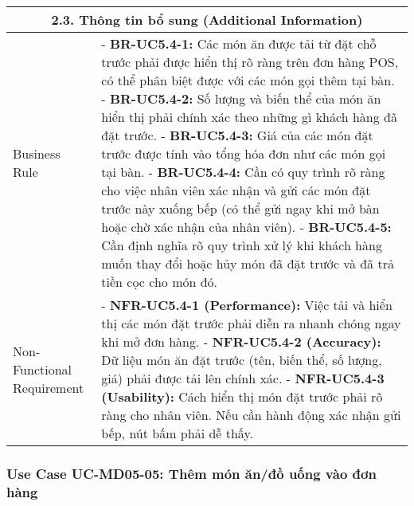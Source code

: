 \begin{longtable}{|m{4cm}|p{11cm}|}
\hline
\multicolumn{2}{|c|}{\textbf{2.3. Thông tin bổ sung (Additional Information)}} \\
\hline
Business Rule & - \textbf{BR-UC5.4-1:} Các món ăn được tải từ đặt chỗ trước phải được hiển thị rõ ràng trên đơn hàng POS, có thể phân biệt được với các món gọi thêm tại bàn. \newline - \textbf{BR-UC5.4-2:} Số lượng và biến thể của món ăn hiển thị phải chính xác theo những gì khách hàng đã đặt trước. \newline - \textbf{BR-UC5.4-3:} Giá của các món đặt trước được tính vào tổng hóa đơn như các món gọi tại bàn. \newline - \textbf{BR-UC5.4-4:} Cần có quy trình rõ ràng cho việc nhân viên xác nhận và gửi các món đặt trước này xuống bếp (có thể gửi ngay khi mở bàn hoặc chờ xác nhận của nhân viên). \newline - \textbf{BR-UC5.4-5:} Cần định nghĩa rõ quy trình xử lý khi khách hàng muốn thay đổi hoặc hủy món đã đặt trước và đã trả tiền cọc cho món đó. \\
\hline
Non-Functional Requirement & - \textbf{NFR-UC5.4-1 (Performance):} Việc tải và hiển thị các món đặt trước phải diễn ra nhanh chóng ngay khi mở đơn hàng. \newline - \textbf{NFR-UC5.4-2 (Accuracy):} Dữ liệu món ăn đặt trước (tên, biến thể, số lượng, giá) phải được tải lên chính xác. \newline - \textbf{NFR-UC5.4-3 (Usability):} Cách hiển thị món đặt trước phải rõ ràng cho nhân viên. Nếu cần hành động xác nhận gửi bếp, nút bấm phải dễ thấy. \\
\hline
\end{longtable}

\subsubsection{Use Case UC-MD05-05: Thêm món ăn/đồ uống vào đơn hàng}

